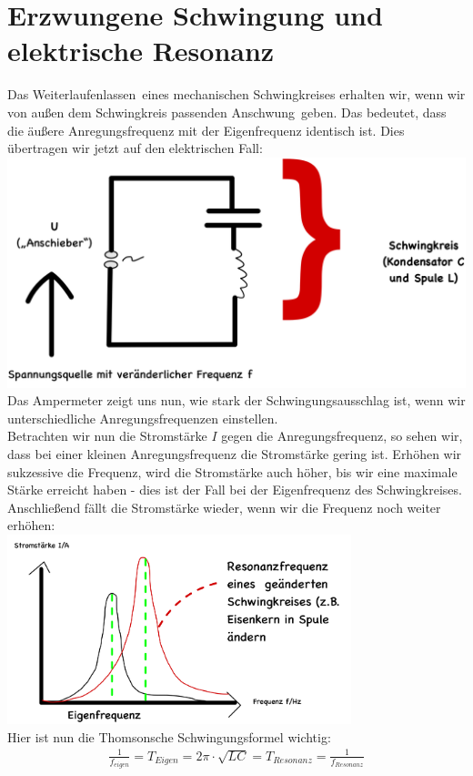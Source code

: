 \documentclass[12pt,a4paper]{report}
\begin{document}
	\section{Erzwungene Schwingung und elektrische Resonanz}
	Das \dq Weiterlaufenlassen\dq\ eines mechanischen Schwingkreises erhalten wir, wenn wir von außen dem Schwingkreis passenden \dq Anschwung\dq\ geben.
	Das bedeutet, dass die äußere Anregungsfrequenz mit der Eigenfrequenz identisch ist.
	Dies übertragen wir jetzt auf den elektrischen Fall:\\
	\includegraphics[width=\textwidth]{Image.jpeg.png} \\
	Das Ampermeter zeigt uns nun, wie stark der Schwingungsausschlag ist, wenn wir unterschiedliche Anregungsfrequenzen einstellen.\\
	Betrachten wir nun die Stromstärke $I$ gegen die Anregungsfrequenz, so sehen wir, dass bei einer kleinen Anregungsfrequenz die Stromstärke gering ist.
	Erhöhen wir sukzessive die Frequenz, wird die Stromstärke auch höher, bis wir eine maximale Stärke erreicht haben - dies ist der Fall bei der Eigenfrequenz des Schwingkreises.
	Anschließend fällt die Stromstärke wieder, wenn wir die Frequenz noch weiter erhöhen: \\
	\includegraphics[width=0.75\textwidth]{IMG_1930.jpg}\\
	Hier ist nun die Thomsonsche Schwingungsformel wichtig:\\
	\begin{align*}
		\frac{1}{f_{eigen}} = T_{Eigen} = 2\pi \cdot \sqrt{LC} = T_{Resonanz} = \frac{1}{f_{Resonanz}}
	\end{align*}
\end{document}

